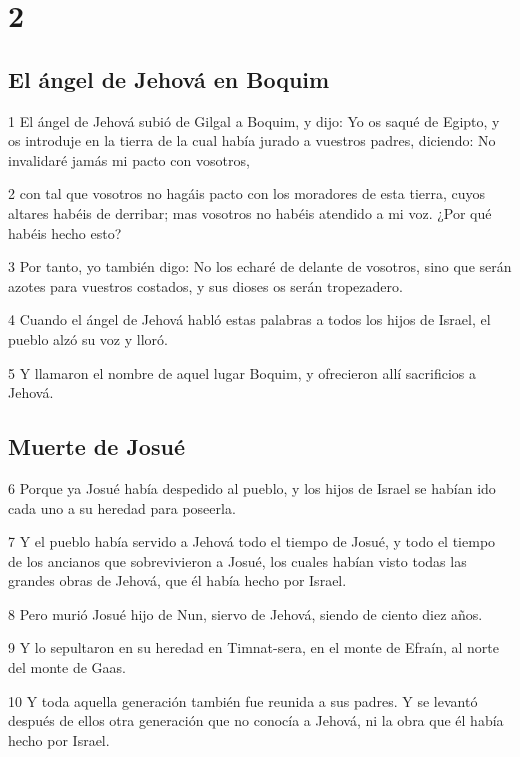 \chapter{2}

\section*{El ángel de Jehová en Boquim}

\par 1 El ángel de Jehová subió de Gilgal a Boquim, y dijo: Yo os saqué de Egipto, y os introduje en la tierra de la cual había jurado a vuestros padres, diciendo: No invalidaré jamás mi pacto con vosotros,
\par 2 con tal que vosotros no hagáis pacto con los moradores de esta tierra, cuyos altares habéis de derribar; mas vosotros no habéis atendido a mi voz. ¿Por qué habéis hecho esto?
\par 3 Por tanto, yo también digo: No los echaré de delante de vosotros, sino que serán azotes para vuestros costados, y sus dioses os serán tropezadero.
\par 4 Cuando el ángel de Jehová habló estas palabras a todos los hijos de Israel, el pueblo alzó su voz y lloró.
\par 5 Y llamaron el nombre de aquel lugar Boquim, y ofrecieron allí sacrificios a Jehová.

\section*{Muerte de Josué }

\par 6 Porque ya Josué había despedido al pueblo, y los hijos de Israel se habían ido cada uno a su heredad para poseerla.
\par 7 Y el pueblo había servido a Jehová todo el tiempo de Josué, y todo el tiempo de los ancianos que sobrevivieron a Josué, los cuales habían visto todas las grandes obras de Jehová, que él había hecho por Israel.
\par 8 Pero murió Josué hijo de Nun, siervo de Jehová, siendo de ciento diez años.
\par 9 Y lo sepultaron en su heredad en Timnat-sera, en el monte de Efraín, al norte del monte de Gaas.
\par 10 Y toda aquella generación también fue reunida a sus padres. Y se levantó después de ellos otra generación que no conocía a Jehová, ni la obra que él había hecho por Israel.


